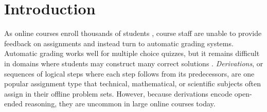 \documentclass{sigchi}
\begin{document}








 

\section{Introduction}


As online courses enroll thousands of students \cite{enroll}, course staff are unable to provide feedback on assignments and instead turn to automatic grading systems. Automatic grading works well for multiple choice quizzes, but it remains difficult in domains where students may construct many correct solutions \cite{automated-scoring-design, automated-grading}. \textit{Derivations}, or sequences of logical steps where each step follows from its predecessors, are one popular assignment type that technical, mathematical, or scientific subjects often assign in their offline problem sets. However, because derivations encode open-ended reasoning, they are uncommon in large online courses today.
\end{document}
